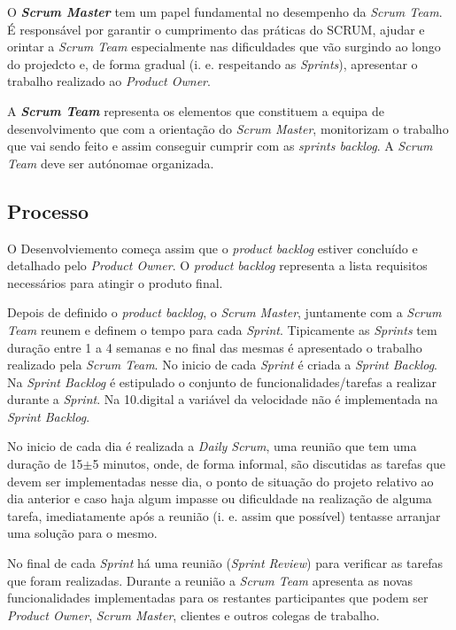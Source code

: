 O \textbf{\textit{Scrum Master}} tem um papel fundamental no desempenho da \textit{Scrum Team}. É responsável por garantir o cumprimento das práticas do SCRUM, ajudar e orintar a \textit{Scrum Team} especialmente nas dificuldades que vão surgindo ao longo do projedcto e, de forma gradual (i. e. respeitando as \textit{Sprints}), apresentar o trabalho realizado ao \textit{Product Owner}.

A \textbf{\textit{Scrum Team}} representa os elementos que constituem a equipa de desenvolvimento que com a orientação do \textit{Scrum Master}, monitorizam o trabalho que vai sendo feito e assim conseguir cumprir com as \textit{sprints backlog}. A \textit{Scrum Team} deve ser autónomae organizada.

\subsection{Processo}

O Desenvolviemento começa assim que o \textit{product backlog} estiver concluído e detalhado pelo \textit{Product Owner}. O \textit{product backlog} representa a lista requisitos necessários para atingir o produto final. 

Depois de definido o \textit{product backlog}, o \textit{Scrum Master}, juntamente com a \textit{Scrum Team} reunem e definem o tempo para cada \textit{Sprint}. Tipicamente as \textit{Sprints} tem duração entre 1 a 4 semanas e no final das mesmas é apresentado o trabalho realizado pela \textit{Scrum Team}. No inicio de cada \textit{Sprint} é criada a \textit{Sprint Backlog}. Na \textit{Sprint Backlog} é estipulado o conjunto de funcionalidades/tarefas a realizar durante a \textit{Sprint}. Na 10.digital a variável da velocidade não é implementada na \textit{Sprint Backlog}.

No inicio de cada dia é realizada a \textit{Daily Scrum}, uma reunião que tem uma duração de 15$\pm$5 minutos, onde, de forma informal, são discutidas as tarefas que devem ser implementadas nesse dia, o ponto de situação do projeto relativo ao dia anterior e caso haja algum impasse ou dificuldade na realização de alguma tarefa, imediatamente após a reunião (i. e. assim que possível) tentasse arranjar uma solução para o mesmo. 

No final de cada \textit{Sprint} há uma reunião (\textit{Sprint Review}) para verificar as tarefas que foram realizadas. Durante a reunião a \textit{Scrum Team} apresenta as novas funcionalidades implementadas para os restantes participantes que podem ser \textit{Product Owner}, \textit{Scrum Master}, clientes e outros colegas de trabalho. 

